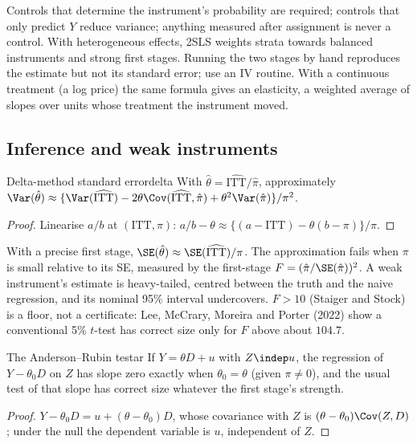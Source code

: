 \documentclass[11pt]{article}
\begin{document}
Controls that determine the instrument's probability are required; controls that only predict $Y$ reduce variance; anything
measured after assignment is never a control. With heterogeneous effects, 2SLS weights strata towards balanced instruments and
strong first stages. Running the two stages by hand reproduces the estimate but not its standard error; use an IV routine. With a
continuous treatment (a log price) the same formula gives an elasticity, a weighted average of slopes over units whose treatment
the instrument moved.

\subsection{Inference and weak instruments}

\begin{prop}{Delta-method standard error}{delta}
With $\hat\theta = \widehat{\text{ITT}}/\hat\pi$, approximately
$\Var(\hat\theta) \approx \{\Var(\widehat{\text{ITT}}) - 2\theta\Cov(\widehat{\text{ITT}}, \hat\pi) + \theta^2\Var(\hat\pi)\}/\pi^2$.
\end{prop}
\begin{proof}
Linearise $a/b$ at $(\text{ITT}, \pi)$: $a/b - \theta \approx \{(a - \text{ITT}) - \theta(b - \pi)\}/\pi$.
\end{proof}

With a precise first stage, $\SE(\hat\theta) \approx \SE(\widehat{\text{ITT}})/\pi$. The approximation fails when $\pi$ is small relative to its
SE, measured by the first-stage $F = (\hat\pi/\SE(\hat\pi))^2$. A weak instrument's estimate is heavy-tailed, centred between the truth
and the naive regression, and its nominal 95\% interval undercovers. $F > 10$ (Staiger and Stock) is a floor, not a certificate: Lee,
McCrary, Moreira and Porter (2022) show a conventional 5\% $t$-test has correct size only for $F$ above about $104.7$.

\begin{prop}{The Anderson--Rubin test}{ar}
If $Y = \theta D + u$ with $Z \indep u$, the regression of $Y - \theta_0D$ on $Z$ has slope zero exactly when $\theta_0 = \theta$ (given $\pi \ne 0$),
and the usual test of that slope has correct size whatever the first stage's strength.
\end{prop}
\begin{proof}
$Y - \theta_0D = u + (\theta - \theta_0)D$, whose covariance with $Z$ is $(\theta - \theta_0)\Cov(Z, D)$; under the null the dependent variable is
$u$, independent of $Z$.
\end{proof}
\end{document}
